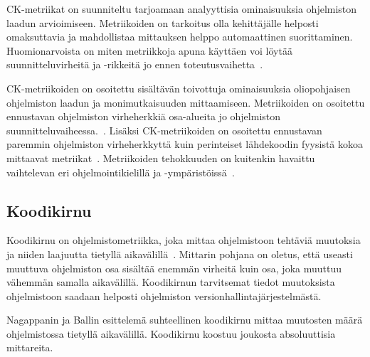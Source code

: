 \documentclass[finnish]{tktltiki2}
\theoremstyle{definition}
\theoremstyle{remark}
\begin{document}
CK-metriikat on suunniteltu tarjoamaan analyyttisia ominaisuuksia ohjelmiston laadun arvioimiseen. Metriikoiden on tarkoitus olla kehittäjälle helposti omaksuttavia ja mahdollistaa mittauksen helppo automaattinen suorittaminen. Huomionarvoista on miten metriikkoja apuna käyttäen voi löytää suunnitteluvirheitä ja -rikkeitä jo ennen toteutusvaihetta~\cite{CK94}.

CK-metriikoiden on osoitettu sisältävän toivottuja ominaisuuksia oliopohjaisen ohjelmiston laadun ja monimutkaisuuden mittaamiseen. Metriikoiden on osoitettu ennustavan ohjelmiston virheherkkiä osa-alueita jo ohjelmiston suunnitteluvaiheessa.~\cite{CK94, BBM96, SK03}. Lisäksi CK-metriikoiden on osoitettu ennustavan paremmin ohjelmiston virheherkkyttä kuin perinteiset lähdekoodin fyysistä kokoa mittaavat metriikat~\cite{BB96}. Metriikoiden tehokkuuden on kuitenkin havaittu vaihtelevan eri ohjelmointikielillä ja -ympäristöissä~\cite{SK03}.


\subsection{Koodikirnu}

Koodikirnu on ohjelmistometriikka, joka mittaa ohjelmistoon tehtäviä muutoksia ja niiden laajuutta tietyllä aikavälillä~\cite{NB05}. Mittarin pohjana on oletus, että useasti muuttuva ohjelmiston osa sisältää enemmän virheitä kuin osa, joka muuttuu vähemmän samalla aikavälillä. Koodikirnun tarvitsemat tiedot muutoksista ohjelmistoon saadaan helposti ohjelmiston versionhallintajärjestelmästä.

Nagappanin ja Ballin esittelemä suhteellinen koodikirnu mittaa muutosten määrä ohjelmistossa tietyllä aikavälillä. Koodikirnu koostuu joukosta absoluuttisia mittareita.
\end{document}

